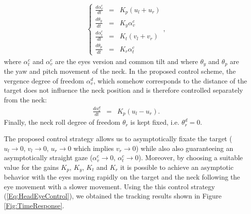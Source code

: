 \begin{eqnarray} \label{Eq:HeadEyeControl}
\left\{ \begin{matrix}
\frac{d \alpha_v^c}{ d t} &=&   K_p (u_l + u_r)\\
\frac{d \theta_y}{ d t} &=&   K_y \alpha_v^c \\
\frac{d \alpha_t^c} {d t} &=&   K_t (v_l + v_r)\\
\frac{d \theta_p} {d t} &=&   K_r \alpha_t^c
\end{matrix} \right.,
\end{eqnarray}
where $\alpha_t^c$ and $\alpha_v^c$ are the eyes version and common tilt and where $\theta_y$ and $\theta_p$ are the yaw and pitch movement of the neck. In the proposed control scheme, the vergence degree of freedom $\alpha_v^d$, which somehow corresponds to the distance of the target does not influence the neck position and is therefore controlled separately from the neck:
\begin{eqnarray} 
\frac{d \alpha_v^d}{ d t} &=&   K_p (u_l - u_r).
\end{eqnarray}
Finally, the neck roll degree of freedom $\theta_r$ is kept fixed, i.e. $\theta_r^d=0$.

The proposed control strategy allows us to asymptotically fixate the target ($u_l \rightarrow 0$, $v_l \rightarrow 0$, $u_r \rightarrow 0$ which implies $v_r \rightarrow 0$) while also also guaranteeing an asymptotically  straight gaze ($\alpha_v^c \rightarrow 0$, $\alpha_t^c \rightarrow 0$). Moreover, by choosing a suitable value for the gains $K_p$, $K_y$, $K_t$ and $K_r$ it is possible to achieve an asymptotic behavior with the eyes moving rapidly on the target and the neck following the eye movement with a slower movement. Using the this control strategy (\ref{Eq:HeadEyeControl}), we obtained the tracking results shown in Figure \ref{Fig:TimeResponse}.


